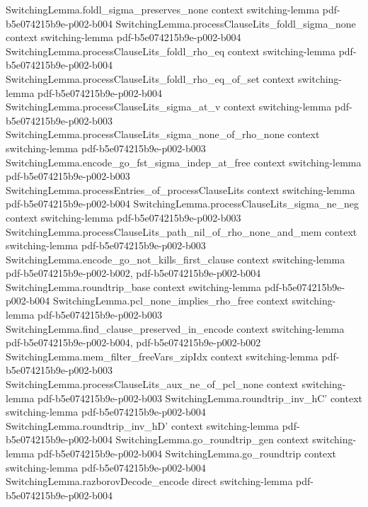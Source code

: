 \begin{theorem}
\proofstep
  {SwitchingLemma.foldl_sigma_preserves_none}
  {context}
  {switching-lemma}
  {pdf-b5e074215b9e-p002-b004}
\proofstep
  {SwitchingLemma.processClauseLits_foldl_sigma_none}
  {context}
  {switching-lemma}
  {pdf-b5e074215b9e-p002-b004}
\proofstep
  {SwitchingLemma.processClauseLits_foldl_rho_eq}
  {context}
  {switching-lemma}
  {pdf-b5e074215b9e-p002-b004}
\proofstep
  {SwitchingLemma.processClauseLits_foldl_rho_eq_of_set}
  {context}
  {switching-lemma}
  {pdf-b5e074215b9e-p002-b004}
\proofstep
  {SwitchingLemma.processClauseLits_sigma_at_v}
  {context}
  {switching-lemma}
  {pdf-b5e074215b9e-p002-b003}
\proofstep
  {SwitchingLemma.processClauseLits_sigma_none_of_rho_none}
  {context}
  {switching-lemma}
  {pdf-b5e074215b9e-p002-b003}
\proofstep
  {SwitchingLemma.encode_go_fst_sigma_indep_at_free}
  {context}
  {switching-lemma}
  {pdf-b5e074215b9e-p002-b003}
\proofstep
  {SwitchingLemma.processEntries_of_processClauseLits}
  {context}
  {switching-lemma}
  {pdf-b5e074215b9e-p002-b004}
\proofstep
  {SwitchingLemma.processClauseLits_sigma_ne_neg}
  {context}
  {switching-lemma}
  {pdf-b5e074215b9e-p002-b003}
\proofstep
  {SwitchingLemma.processClauseLits_path_nil_of_rho_none_and_mem}
  {context}
  {switching-lemma}
  {pdf-b5e074215b9e-p002-b003}
\proofstep
  {SwitchingLemma.encode_go_not_kills_first_clause}
  {context}
  {switching-lemma}
  {pdf-b5e074215b9e-p002-b002,
    pdf-b5e074215b9e-p002-b004}
\proofstep
  {SwitchingLemma.roundtrip_base}
  {context}
  {switching-lemma}
  {pdf-b5e074215b9e-p002-b004}
\proofstep
  {SwitchingLemma.pcl_none_implies_rho_free}
  {context}
  {switching-lemma}
  {pdf-b5e074215b9e-p002-b003}
\proofstep
  {SwitchingLemma.find_clause_preserved_in_encode}
  {context}
  {switching-lemma}
  {pdf-b5e074215b9e-p002-b004,
    pdf-b5e074215b9e-p002-b002}
\proofstep
  {SwitchingLemma.mem_filter_freeVars_zipIdx}
  {context}
  {switching-lemma}
  {pdf-b5e074215b9e-p002-b003}
\proofstep
  {SwitchingLemma.processClauseLits_aux_ne_of_pcl_none}
  {context}
  {switching-lemma}
  {pdf-b5e074215b9e-p002-b003}
\proofstep
  {SwitchingLemma.roundtrip_inv_hC'}
  {context}
  {switching-lemma}
  {pdf-b5e074215b9e-p002-b004}
\proofstep
  {SwitchingLemma.roundtrip_inv_hD'}
  {context}
  {switching-lemma}
  {pdf-b5e074215b9e-p002-b004}
\proofstep
  {SwitchingLemma.go_roundtrip_gen}
  {context}
  {switching-lemma}
  {pdf-b5e074215b9e-p002-b004}
\proofstep
  {SwitchingLemma.go_roundtrip}
  {context}
  {switching-lemma}
  {pdf-b5e074215b9e-p002-b004}
\proofstep
  {SwitchingLemma.razborovDecode_encode}
  {direct}
  {switching-lemma}
  {pdf-b5e074215b9e-p002-b004}

\end{theorem}
